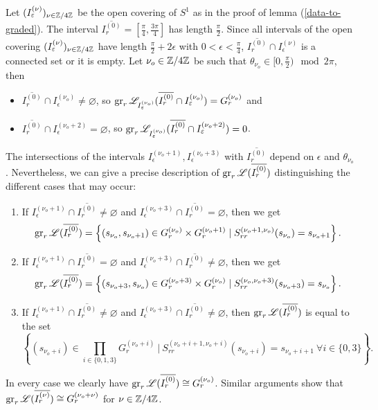 Let $(I_\varepsilon^{(\nu)})_{\nu \in \mathbb{Z}/4\mathbb{Z}}$ be the open covering of $S^1$ as in the proof of lemma (\ref{data-to-graded}).
The interval $\overline{I_r^{(0)}} = [\frac{\pi}{4},\frac{3\pi}{4}]$ has length $\frac{\pi}{2}$. Since all intervals of the open covering $(I_\varepsilon^{(\nu)})_{\nu \in \mathbb{Z}/4\mathbb{Z}}$ have length $\frac{\pi}{2}+2\epsilon$ with $0<\epsilon<\frac{\pi}{4}$, $\overline{I_r^{(0)}} \cap I_\epsilon^{(\nu)}$ is a connected set or it is empty. 
Let $\nu_o \in \mathbb{Z}/4\mathbb{Z}$ be such that $\theta_{\nu_o} \in [0, \frac{\pi}{2}) \mod 2\pi$, then 
\begin{itemize}
    \item $\overline{I_r^{(0)}} \cap I_\epsilon^{(\nu_o)} \neq \varnothing$, so $\operatorname{gr}_r\mathscr{L}_{I_\varepsilon^{(\nu_o)}}(\overline{I_r^{(0)}} \cap I_\varepsilon^{(\nu_o)}) = G_r^{(\nu_o)}$ and 
    \item $\overline{I_r^{(0)}} \cap I_\epsilon^{(\nu_o+2)} = \varnothing$, so $\operatorname{gr}_r\mathscr{L}_{I_\varepsilon^{(\nu_o)}}(\overline{I_r^{(0)}} \cap I_\varepsilon^{(\nu_o+2)}) = 0$.
\end{itemize}
The intersections of the intervals $I^{(\nu_o+1)}_\epsilon, I^{(\nu_o+3)}_{\epsilon}$ with $\overline{I_r^{(0)}}$ depend on $\epsilon$ and $\theta_{\nu_o}$. Nevertheless, we can give a precise description of $\operatorname{gr}_r\mathscr{L}(\overline{I_r^{(0)}})$ distinguishing the different cases that may occur:
\begin{enumerate}
    \item If $I_\epsilon^{(\nu_o+1)} \cap \overline{I_r^{(0)}} \neq \varnothing$ and $I_\epsilon^{(\nu_o+3)} \cap \overline{I_r^{(0)}} = \varnothing$, then we get
    \[
    \operatorname{gr}_r\mathscr{L}(\overline{I_r^{(0)}}) = \left\{(s_{\nu_o}, s_{\nu_o+1}) \in G_r^{(\nu_o)} \times G_r^{(\nu_o+1)} \mid S_{rr}^{(\nu_o+1,\nu_o)}(s_{\nu_o}) = s_{\nu_o+1} \right\}.
    \] 
    \item If $I_\epsilon^{(\nu_o+1)} \cap \overline{I_r^{(0)}} = \varnothing$ and $I_\epsilon^{(\nu_o+3)} \cap \overline{I_r^{(0)}} \neq \varnothing$, then we get
    \[
    \operatorname{gr}_r\mathscr{L}(\overline{I_r^{(0)}}) = \left\{(s_{\nu_o+3}, s_{\nu_o}) \in G_r^{(\nu_o+3)} \times G_r^{(\nu_o)} \mid S_{rr}^{(\nu_o,\nu_o+3)}(s_{\nu_o+3}) = s_{\nu_o} \right\}.
    \]
    \item If $I_\epsilon^{(\nu_o+1)} \cap \overline{I_r^{(0)}} \neq \varnothing$ and $I_\epsilon^{(\nu_o+3)} \cap \overline{I_r^{(0)}} \neq \varnothing$, then $\operatorname{gr}_r\mathscr{L}(\overline{I_r^{(0)}})$ is equal to the set
    \[
     \left\{(s_{\nu_o+i}) \in \prod_{i \in \{0,1,3\}} G_r^{(\nu_o+i)}~ \Big\vert ~ S_{rr}^{(\nu_o+i+1,\nu_o+i)}(s_{\nu_o+i}) = s_{\nu_o+i+1}
    ~ \forall i \in \{0,3\}\right\}.
    \]
\end{enumerate}
In every case we clearly have $\operatorname{gr}_r\mathscr{L}(\overline{I_r^{(0)}}) \cong G_r^{(\nu_o)}$. Similar arguments show that $\operatorname{gr}_r\mathscr{L}(\overline{I_r^{(\nu)}}) \cong G_r^{(\nu_o+\nu)}$ for $\nu \in \mathbb{Z}/4\mathbb{Z}$.

